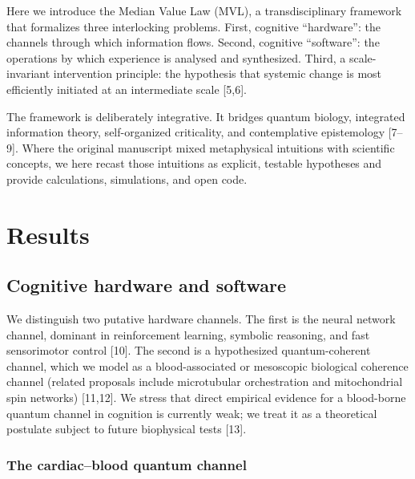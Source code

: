 \documentclass[11pt,a4paper]{article}
\begin{document}
Here we introduce the Median Value Law (MVL), a transdisciplinary framework that formalizes three interlocking problems. First, cognitive ``hardware'': the channels through which information flows. Second, cognitive ``software'': the operations by which experience is analysed and synthesized. Third, a scale-invariant intervention principle: the hypothesis that systemic change is most efficiently initiated at an intermediate scale [5,6].

The framework is deliberately integrative. It bridges quantum biology, integrated information theory, self-organized criticality, and contemplative epistemology [7--9]. Where the original manuscript mixed metaphysical intuitions with scientific concepts, we here recast those intuitions as explicit, testable hypotheses and provide calculations, simulations, and open code.

\section{Results}

\subsection{Cognitive hardware and software}

We distinguish two putative hardware channels. The first is the neural network channel, dominant in reinforcement learning, symbolic reasoning, and fast sensorimotor control [10]. The second is a hypothesized quantum-coherent channel, which we model as a blood-associated or mesoscopic biological coherence channel (related proposals include microtubular orchestration and mitochondrial spin networks) [11,12]. We stress that direct empirical evidence for a blood-borne quantum channel in cognition is currently weak; we treat it as a theoretical postulate subject to future biophysical tests [13].

\subsubsection*{The cardiac--blood quantum channel}
\end{document}
